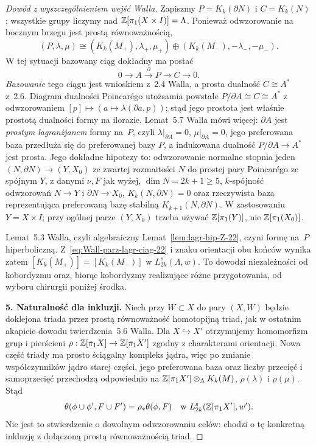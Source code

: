 \begin{proof}[Dowód z wyszczególnieniem wejść Walla]
Zapiszmy $P=K_k(\partial N)$ i $C=K_k(N)$;
wszystkie grupy liczymy nad
$\mathbb{Z}[\pi_1(X\times I)]=\Lambda$. Ponieważ
odwzorowanie na bocznym brzegu jest prostą równoważnością,
\[
 (P,\lambda,\mu)
  \cong (K_k(M_+),\lambda_+,\mu_+)
       \oplus(K_k(M_-),-\lambda_-,-\mu_-).
\]
W tej sytuacji bazowany ciąg dokładny ma postać
\begin{equation}\label{eq:Wall-parz-lagr-ciag-22}
 0\longrightarrow A\xrightarrow{\,\partial\,}P
   \longrightarrow C\longrightarrow0.
\end{equation}
\emph{Bazowanie} tego ciągu jest wnioskiem z~2.4
Walla, a prosta dualność $C\cong A^*$ z~2.6.
Diagram dualności Poincarégo utożsamia powstałe
$P/\partial A\cong C\cong A^*$ z odwzorowaniem
$[p]\mapsto(a\mapsto\lambda(\partial a,p))$;
stąd jego prostota jest właśnie prostotą
dualności formy na ilorazie.
Lemat~5.7 Walla mówi więcej: $\partial A$ jest
\emph{prostym lagranżjanem} formy na~$P$,
czyli $\lambda|_{\partial A}=0$,
$\mu|_{\partial A}=0$, jego preferowana baza
przedłuża się do preferowanej bazy $P$,
a indukowana dualność $P/\partial A\to A^*$
jest prosta. Jego dokładne hipotezy to: odwzorowanie normalne
stopnia jeden $(N,\partial N)\to(Y,X_0)$ ze zwartej
rozmaitości $N$ do prostej pary Poincarégo ze
spójnym $Y$, z danymi $\nu,F$ jak wyżej,
$\dim N=2k+1\geq5$, $k$-spójność odwzorowań
$N\to Y$ i $\partial N\to X_0$,
$K_k(N,\partial N)=0$ oraz rzeczywista baza
reprezentująca preferowaną bazę stabilną
$K_{k+1}(N,\partial N)$. W zastosowaniu
$Y=X\times I$; przy ogólnej parze $(Y,X_0)$
trzeba używać $\mathbb{Z}[\pi_1(Y)]$, nie
$\mathbb{Z}[\pi_1(X_0)]$.

Lemat~5.3 Walla, czyli algebraiczny
Lemat~\ref{lem:lagr-hip-Z-22}, czyni formę
na~$P$ hiperboliczną. Z~\eqref{eq:Wall-parz-lagr-ciag-22}
i znaku orientacji obu końców wynika zatem
$[K_k(M_+)]=[K_k(M_-)]$ w $L^s_{2k}(\Lambda,w)$.
To dowodzi niezależności od kobordyzmu oraz,
biorąc kobordyzmy realizujące różne przygotowania,
od wyboru chirurgii poniżej środka.

\textbf{5. Naturalność dla inkluzji.}
Niech przy $W\subset X$ do pary $(X,W)$ będzie
doklejona triada przez prostą równoważność
homotopijną triad, jak w ostatnim akapicie dowodu
twierdzenia~5.6 Walla. Dla $X\hookrightarrow X'$
otrzymujemy homomorfizm grup i pierścieni
$\rho:\mathbb{Z}[\pi_1X]\to\mathbb{Z}[\pi_1X']$ zgodny
z charakterami orientacji. Nowa część triady
ma prosto ściągalny kompleks jądra, więc po
zmianie współczynników jądro starej części,
jego preferowana baza oraz liczby przecięć
i samoprzecięć przechodzą odpowiednio na
$\mathbb{Z}[\pi_1X']\otimes_{\Lambda}K_k(M)$,
$\rho(\lambda)$ i $\rho(\mu)$. Stąd
\[
 \theta(\phi\cup\phi',F\cup F')
       =\rho_*\theta(\phi,F)
       \quad\text{w }L^s_{2k}(\mathbb{Z}[\pi_1X'],w').
\]
Nie jest to stwierdzenie o dowolnym odwzorowaniu
celów: chodzi o tę konkretną inkluzję z dołączoną
prostą równoważnością triad.
\end{proof}

